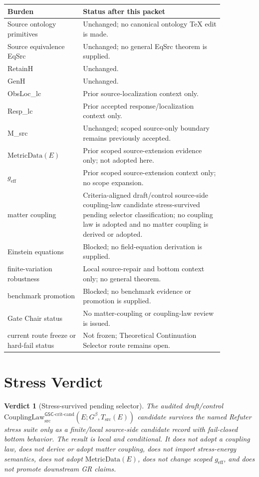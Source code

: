 \documentclass[11pt]{article}
\newcommand{\Gbeta}{G^\beta}
\newcommand{\geff}{g_{\mathrm{eff}}}
\newcommand{\CouplingLawCrit}{\mathrm{CouplingLaw}^{\mathsf{GSC}\mbox{-}\mathrm{crit}\mbox{-}\mathrm{cand}}_{\mathrm{src}}}
\newcommand{\MetricData}{\mathrm{MetricData}}
\newtheorem{verdict}{Verdict}
\begin{document}
\begin{longtable}{p{0.30\linewidth}p{0.56\linewidth}}
\toprule
Burden & Status after this packet \\
\midrule
Source ontology primitives & Unchanged; no canonical ontology TeX edit is made. \\
Source equivalence EqSrc & Unchanged; no general EqSrc theorem is supplied. \\
RetainH & Unchanged. \\
GenH & Unchanged. \\
ObsLoc\_lc & Prior source-localization context only. \\
Resp\_lc & Prior accepted response/localization context only. \\
M\_src & Unchanged; scoped source-only boundary remains previously accepted. \\
\(\MetricData(E)\) & Prior scoped source-extension evidence only; not adopted here. \\
\(\geff\) & Prior scoped source-extension context only; no scope expansion. \\
matter coupling & Criteria-aligned draft/control source-side coupling-law candidate stress-survived pending selector classification; no coupling law is adopted and no matter coupling is derived or adopted. \\
Einstein equations & Blocked; no field-equation derivation is supplied. \\
finite-variation robustness & Local source-repair and bottom context only; no general theorem. \\
benchmark promotion & Blocked; no benchmark evidence or promotion is supplied. \\
Gate Chair status & No matter-coupling or coupling-law review is issued. \\
current route freeze or hard-fail status & Not frozen; Theoretical Continuation Selector route remains open. \\
\bottomrule
\end{longtable}

\section{Stress Verdict}

\begin{verdict}[Stress-survived pending selector]
The audited draft/control
\(\CouplingLawCrit(E;\Gbeta,T_{\mathrm{src}}(E))\) candidate survives the
named Refuter stress suite only as a finite/local source-side candidate record
with fail-closed bottom behavior. The result is local and conditional. It does
not adopt a coupling law, does not derive or adopt matter coupling, does not
import stress-energy semantics, does not adopt \(\MetricData(E)\), does not
change scoped \(\geff\), and does not promote downstream GR claims.
\end{verdict}
\end{document}
